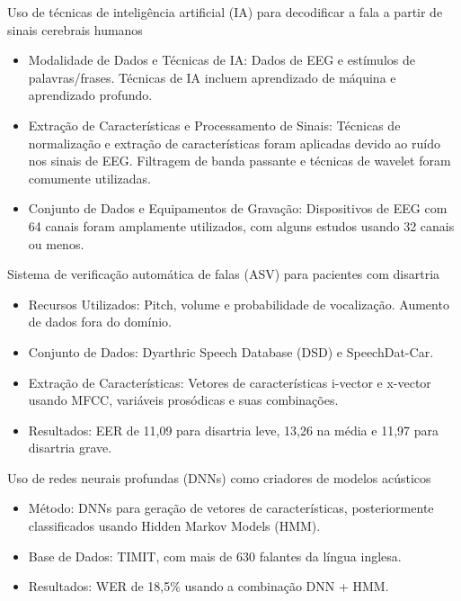 \documentclass{beamer}
\begin{document}
	\begin{frame}{Uso de técnicas de inteligência artificial (IA) para decodificar a fala a partir de sinais cerebrais humanos \cite{WOS:000857544900001}}
		\begin{itemize}
			\item Modalidade de Dados e Técnicas de IA: Dados de EEG e estímulos de palavras/frases. Técnicas de IA incluem aprendizado de máquina e aprendizado profundo.
			\item Extração de Características e Processamento de Sinais: Técnicas de normalização e extração de características foram aplicadas devido ao ruído nos sinais de EEG. Filtragem de banda passante e técnicas de wavelet foram comumente utilizadas.
			\item Conjunto de Dados e Equipamentos de Gravação: Dispositivos de EEG com 64 canais foram amplamente utilizados, com alguns estudos usando 32 canais ou menos.
		\end{itemize}
		
	\end{frame}
	
	\begin{frame}{Sistema de verificação automática de falas (ASV) para pacientes com disartria \cite{salim2023automatic}}
		\begin{itemize}
			\item Recursos Utilizados: Pitch, volume e probabilidade de vocalização. Aumento de dados fora do domínio.
			\item Conjunto de Dados: Dyarthric Speech Database (DSD) e SpeechDat-Car.
			\item Extração de Características: Vetores de características i-vector e x-vector usando MFCC, variáveis prosódicas e suas combinações.
			\item Resultados: EER de 11,09 para disartria leve, 13,26 na média e 11,97 para disartria grave.
		\end{itemize}
		
	\end{frame}

	\begin{frame}{Uso de redes neurais profundas (DNNs) como criadores de modelos acústicos \cite{6296526}}
		\begin{itemize}
			\item Método: DNNs para geração de vetores de características, posteriormente classificados usando Hidden Markov Models (HMM).
			\item Base de Dados: TIMIT, com mais de 630 falantes da língua inglesa.
			\item Resultados: WER de 18,5\% usando a combinação DNN + HMM.
		\end{itemize}
		
	\end{frame}
	
\end{document}

